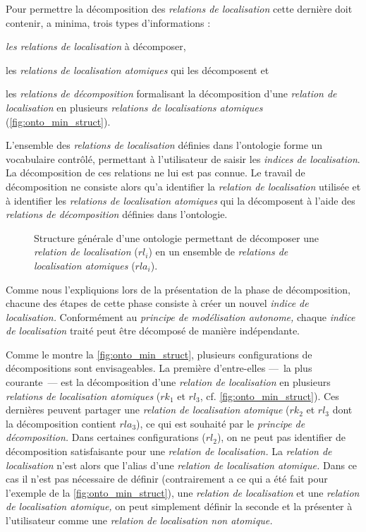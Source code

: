 Pour permettre la décomposition des \emph{relations de localisation}
cette dernière doit contenir, a minima, trois types d'informations :
%
\begin{enumerate*}[label=(\alph*)]
\item \emph{les relations de localisation} à décomposer,
\item les \emph{relations de localisation atomiques} qui les
  décomposent et
\item les \emph{relations de décomposition} formalisant la
  décomposition d'une \emph{relation de localisation} en plusieurs
  \emph{relations de localisations atomiques}
  (\autoref{fig:onto_min_struct}).
\end{enumerate*}
%
L'ensemble des \emph{relations de localisation} définies dans
l'ontologie forme un vocabulaire contrôlé, permettant à l'utilisateur
de saisir les \emph{indices de localisation}. La décomposition de ces
relations ne lui est pas connue. Le travail de décomposition ne
consiste alors qu'a identifier la \emph{relation de localisation}
utilisée et à identifier les \emph{relations de localisation
  atomiques} qui la décomposent à l'aide des \emph{relations de
  décomposition} définies dans l'ontologie.

\begin{figure}
  \centering
   
  \caption[Structure générale d'une ontologie de
  décomposition]{Structure générale d'une ontologie permettant de
    décomposer une \emph{relation de localisation} ($rl_i$) en un
    ensemble de \emph{relations de localisation atomiques} ($rla_i$).}
  \label{fig:onto_min_struct}
\end{figure}

Comme nous l'expliquions lors de la présentation de la phase de
décomposition, chacune des étapes de cette phase consiste à créer un
nouvel \emph{indice de localisation.} Conformément au \emph{principe
  de modélisation autonome,} chaque \emph{indice de localisation}
traité peut être décomposé de manière indépendante.

Comme le montre la \autoref{fig:onto_min_struct}, plusieurs
configurations de décompositions sont envisageables. La première
d'entre-elles ---~la plus courante~--- est la décomposition d'une
\emph{relation de localisation} en plusieurs \emph{relations de
  localisation atomiques} (\eg \(rk_1\) et \(rl_3\),
cf. \autoref{fig:onto_min_struct}).
%
Ces dernières peuvent partager une \emph{relation de localisation
  atomique} (\eg \(rk_2\) et \(rl_3\) dont la décomposition contient
\(rla_3\)), ce qui est souhaité par le \emph{principe de
  décomposition.}
%
Dans certaines configurations (\eg \(rl_2\)), on ne peut pas
identifier de décomposition satisfaisante pour une \emph{relation de
  localisation.} La \emph{relation de localisation} n'est alors que
l'alias d'une \emph{relation de localisation atomique.} Dans ce cas il
n'est pas nécessaire de définir (contrairement a ce qui a été fait
pour l'exemple de la \autoref{fig:onto_min_struct}), une
\emph{relation de localisation} et une \emph{relation de localisation
  atomique,} on peut simplement définir la seconde et la présenter à
l'utilisateur comme une \emph{relation de localisation non atomique.}

